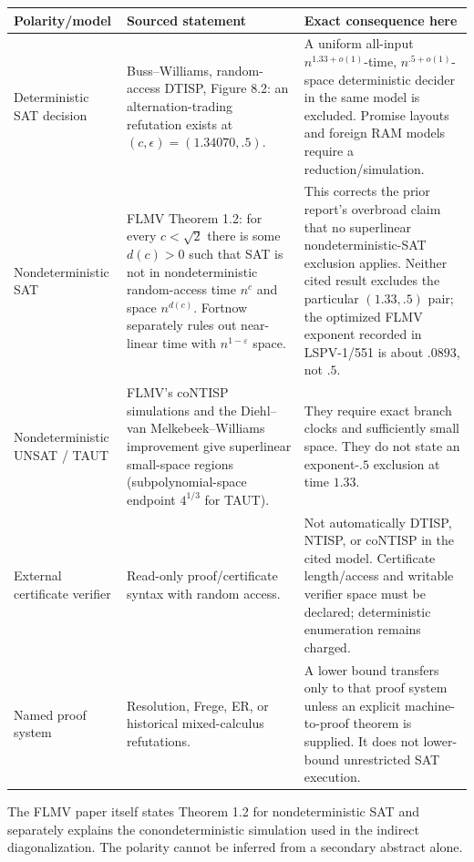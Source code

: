 \documentclass[11pt]{article}
\begin{document}
\begin{center}
\small
\begin{tabular}{p{.20\linewidth}p{.26\linewidth}p{.46\linewidth}}
\toprule
Polarity/model & Sourced statement & Exact consequence here\\
\midrule
Deterministic SAT decision & Buss--Williams, random-access DTISP, Figure 8.2: an alternation-trading refutation exists at $(c,\epsilon)=(1.34070,.5)$. & A uniform all-input $n^{1.33+o(1)}$-time, $n^{.5+o(1)}$-space deterministic decider in the same model is excluded.  Promise layouts and foreign RAM models require a reduction/simulation.\\
Nondeterministic SAT & FLMV Theorem 1.2: for every $c<\sqrt2$ there is some $d(c)>0$ such that SAT is not in nondeterministic random-access time $n^c$ and space $n^{d(c)}$.  Fortnow separately rules out near-linear time with $n^{1-\varepsilon}$ space. & This corrects the prior report's overbroad claim that no superlinear nondeterministic-SAT exclusion applies.  Neither cited result excludes the particular $(1.33,.5)$ pair; the optimized FLMV exponent recorded in LSPV-1/551 is about $.0893$, not $.5$.\\
Nondeterministic UNSAT / TAUT & FLMV's coNTISP simulations and the Diehl--van Melkebeek--Williams improvement give superlinear small-space regions (subpolynomial-space endpoint $4^{1/3}$ for TAUT). & They require exact branch clocks and sufficiently small space.  They do not state an exponent-$.5$ exclusion at time $1.33$.\\
External certificate verifier & Read-only proof/certificate syntax with random access. & Not automatically DTISP, NTISP, or coNTISP in the cited model.  Certificate length/access and writable verifier space must be declared; deterministic enumeration remains charged.\\
Named proof system & Resolution, Frege, ER, or historical mixed-calculus refutations. & A lower bound transfers only to that proof system unless an explicit machine-to-proof theorem is supplied.  It does not lower-bound unrestricted SAT execution.\\
\bottomrule
\end{tabular}
\end{center}

The FLMV paper itself states Theorem 1.2 for nondeterministic SAT and separately explains the conondeterministic simulation used in the indirect diagonalization.  The polarity cannot be inferred from a secondary abstract alone.
\end{document}
